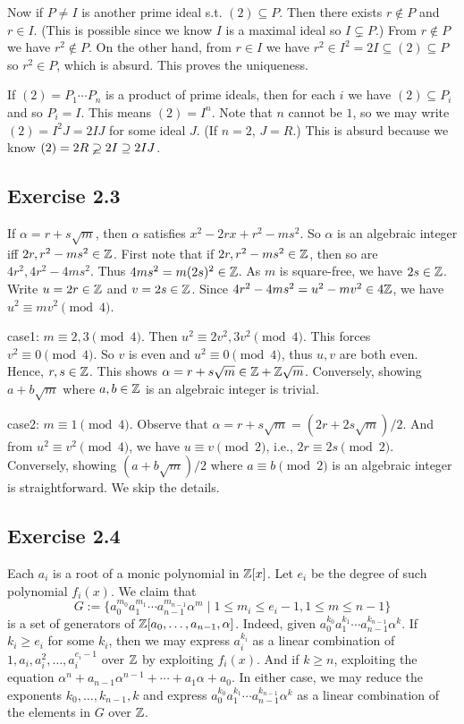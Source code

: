 \documentclass[../Marcus.tex]{subfiles}
\begin{document}
Now if $P\neq I$ is another prime ideal s.t. $(2)\subseteq P$. Then there exists $r\notin P$ and $r\in I$. (This is possible since we know $I$ is a maximal ideal so $I\varsubsetneq P$.) From $r\notin P$ we have $r^2\notin P$. On the other hand, from $r\in I$ we have $r^2\in I^2=2I \subseteq (2)\subseteq P$ so $r^2\in P$, which is absurd. This proves the uniqueness.

If $(2)=P_1\cdots P_n$ is a product of prime ideals, then for each $i$ we have $(2)\subseteq P_i$ and so $P_i=I$. This means $(2)=I^n$. Note that $n$ cannot be $1$, so we may write $(2)=I^2J=2IJ$ for some ideal $J$. (If $n=2$, $J=R$.) This is absurd because we know $(2)=2R\varsupsetneq 2I \supseteq 2IJ$.

\subsection*{Exercise 2.3}

If $\alpha=r+s\sqrt{m}$, then $\alpha$ satisfies $x^2-2rx+r^2-ms^2$. So $\alpha$ is an algebraic integer iff $2r,r^2-ms^2\in\mathbb{Z}$. First note that if $2r,r^2-ms^2\in\mathbb{Z}$, then so are $4r^2,4r^2-4ms^2$. Thus $4ms^2=m(2s)^2\in\mathbb{Z}$. As $m$ is square-free, we have $2s\in\mathbb{Z}$. Write $u=2r\in\mathbb{Z}$ and $v=2s\in\mathbb{Z}$. Since $4r^2-4ms^2=u^2-mv^2\in 4\mathbb{Z}$, we have $u^2 \equiv mv^2 \pmod{4}$.

case1: $m \equiv 2,3 \pmod{4}$. Then $u^2 \equiv 2v^2,3v^2 \pmod{4}$. This forces $v^2 \equiv 0 \pmod{4}$. So $v$ is even and $u^2 \equiv 0 \pmod{4}$, thus $u,v$ are both even. Hence, $r,s\in \mathbb{Z}$. This shows $\alpha=r+s\sqrt{m}\in \mathbb{Z}+\mathbb{Z}\sqrt{m}$. Conversely, showing $a+b\sqrt{m}$ where $a,b\in\mathbb{Z}$ is an algebraic integer is trivial.

case2: $m \equiv 1 \pmod{4}$. Observe that $\alpha=r+s\sqrt{m}=(2r+2s\sqrt{m})/2$. And from $u^2 \equiv v^2 \pmod{4}$, we have $u \equiv v \pmod{2}$, i.e., $2r \equiv 2s \pmod{2}$. Conversely, showing $(a+b\sqrt{m})/2$ where $a \equiv b \pmod{2}$ is an algebraic integer is straightforward. We skip the details.

\subsection*{Exercise 2.4}

Each $a_i$ is a root of a monic polynomial in $\mathbb{Z}[x]$. Let $e_i$ be the degree of such polynomial $f_i(x)$. We claim that $$G:=\{a_0^{m_0}a_1^{m_1}\cdots a_{n-1}^{m_{n-1}}\alpha^m \mid 1\leq m_i \leq e_i-1,1\leq m\leq n-1\}$$ is a set of generators of $\mathbb{Z}[a_0,\ldots,a_{n-1},\alpha]$. Indeed, given $a_0^{k_0}a_1^{k_1}\cdots a_{n-1}^{k_{n-1}}\alpha^k$. If $k_i\geq e_i$ for some $k_i$, then we may express $a_i^{k_i}$ as a linear combination of $1,a_i,a_i^2,\ldots,a_i^{e_i-1}$ over $\mathbb{Z}$ by exploiting $f_i(x)$. And if $k\geq n$, exploiting the equation $\alpha^n+a_{n-1}\alpha^{n-1}+\cdots+a_1\alpha+a_0$. In either case, we may reduce the exponents $k_0,\ldots,k_{n-1},k$ and express $a_0^{k_0}a_1^{k_1}\cdots a_{n-1}^{k_{n-1}}\alpha^k$ as a linear combination of the elements in $G$ over $\mathbb{Z}$.
\end{document}

